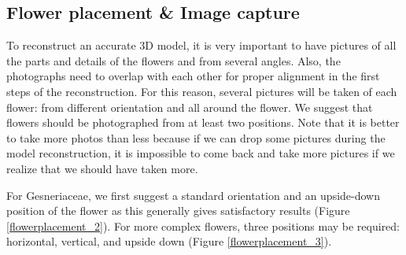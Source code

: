 \documentclass[10pt,letter,english]{article}
\begin{document}
\subsection{Flower placement \& Image capture}
  
To reconstruct an accurate 3D model, it is very important to have pictures of all the parts and details of the flowers and from several angles. Also, the photographs need to overlap with each other for proper alignment in the first steps of the reconstruction. For this reason, several pictures will be taken of each flower: from different orientation and all around the flower.
We suggest that flowers should be photographed from at least two positions. Note that it is better to take more photos than less because if we can drop some pictures during the model reconstruction, it is impossible to come back and take more pictures if we realize that we should have taken more.


\begin{tcolorbox}[width=\linewidth, colback=mygray,title=Suggestion for the Joly Lab,colframe=lightgray]
For Gesneriaceae, we first suggest a standard orientation and an upside-down position of the flower as this generally gives satisfactory results (Figure \ref{flowerplacement_2}). For more complex flowers, three positions may be required: horizontal, vertical, and upside down (Figure \ref{flowerplacement_3}).
\end{tcolorbox}
\end{document}
